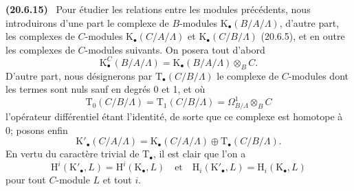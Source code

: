 \documentclass[10pt,oneside]{book}
\makeatletter
\newcommand{\setmanualcurrentlabel}[1]{\def\@currentlabel{#1}}
\newcommand{\oldpage}[2][]{%
  \setcounter{footnote}{0}%
  \marginpar{\scriptsize\textbf{#1}~|~#2}\ignorespaces}
\newenvironment{env}[1][]{\setmanualcurrentlabel{#1}\par\medskip\noindent\textbf{(#1)}\ }{\par}
\makeatother
\begin{document}
\begin{env}[20.6.15]
\label{0.20.6.15-fr}
Pour étudier les relations entre les modules précédents, nous introduirons
d'une part le complexe de $B$-modules
$\mathrm{K}_\bullet(B/A/\Lambda)$, d'autre part, les complexes
\oldpage[0\textsubscript{IV-1}]{142}
de $C$-modules $\mathrm{K}_\bullet(C/A/\Lambda)$ et
$\mathrm{K}_\bullet(C/B/\Lambda)$ (20.6.5), et en outre les complexes de
$C$-modules suivants. On posera tout d'abord
\begin{equation}
\tag{20.6.15.1}
\label{0.20.6.15.1-fr}
  \mathrm{K}^C_\bullet(B/A/\Lambda)=
  \mathrm{K}_\bullet(B/A/\Lambda)\otimes_B C.
\end{equation}
D'autre part, nous désignerons par $\mathrm{T}_\bullet(C/B/\Lambda)$ le
complexe de $C$-modules dont les termes sont nuls sauf en degrés 0 et 1,
et où
\begin{equation}
\tag{20.6.15.2}
\label{0.20.6.15.2-fr}
  \mathrm{T}_0(C/B/\Lambda)=\mathrm{T}_1(C/B/\Lambda)=
  \Omega^1_{B/\Lambda}\otimes_B C
\end{equation}
l'opérateur différentiel étant l'identité, de sorte que ce complexe est
homotope à 0; posons enfin
\begin{equation}
\tag{20.6.15.3}
\label{0.20.6.15.3-fr}
  \mathrm{K}'_\bullet(C/A/\Lambda)=
  \mathrm{K}_\bullet(C/A/\Lambda)\oplus
  \mathrm{T}_\bullet(C/B/\Lambda).
\end{equation}
En vertu du caractère trivial de $\mathrm{T}_\bullet$, il est clair que
l'on a
\begin{equation}
\tag{20.6.15.4}
\label{0.20.6.15.4-fr}
  \mathrm{H}^i(\mathrm{K}'_\bullet,L)=
  \mathrm{H}^i(\mathrm{K}_\bullet,L)
  \quad\text{et}\quad
  \mathrm{H}_i(\mathrm{K}'_\bullet,L)=
  \mathrm{H}_i(\mathrm{K}_\bullet,L)
\end{equation}
pour tout $C$-module $L$ et tout $i$.
\end{env}
\end{document}
